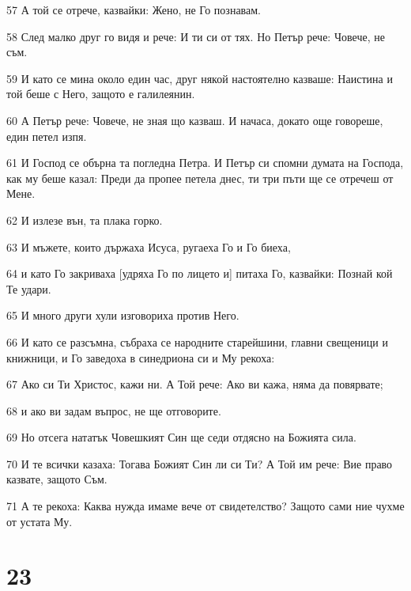 \par 57 А той се отрече, казвайки: Жено, не Го познавам.
\par 58 След малко друг го видя и рече: И ти си от тях. Но Петър рече: Човече, не съм.
\par 59 И като се мина около един час, друг някой настоятелно казваше: Наистина и той беше с Него, защото е галилеянин.
\par 60 А Петър рече: Човече, не зная що казваш. И начаса, докато още говореше, един петел изпя.
\par 61 И Господ се обърна та погледна Петра. И Петър си спомни думата на Господа, как му беше казал: Преди да пропее петела днес, ти три пъти ще се отречеш от Мене.
\par 62 И излезе вън, та плака горко.
\par 63 И мъжете, които държаха Исуса, ругаеха Го и Го биеха,
\par 64 и като Го закриваха [удряха Го по лицето и] питаха Го, казвайки: Познай кой Те удари.
\par 65 И много други хули изговориха против Него.
\par 66 И като се разсъмна, събраха се народните старейшини, главни свещеници и книжници, и Го заведоха в синедриона си и Му рекоха:
\par 67 Ако си Ти Христос, кажи ни. А Той рече: Ако ви кажа, няма да повярвате;
\par 68 и ако ви задам въпрос, не ще отговорите.
\par 69 Но отсега нататък Човешкият Син ще седи отдясно на Божията сила.
\par 70 И те всички казаха: Тогава Божият Син ли си Ти? А Той им рече: Вие право казвате, защото Съм.
\par 71 А те рекоха: Каква нужда имаме вече от свидетелство? Защото сами ние чухме от устата Му.

\chapter{23}

